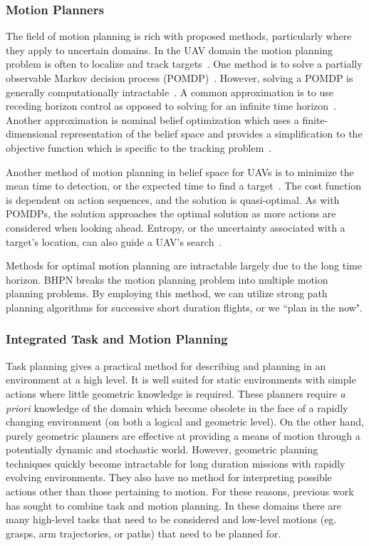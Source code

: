 \documentclass[12pt]{article}
\begin{document}
\subsubsection{Motion Planners} \label{motion planning}

The field of motion planning is rich with proposed methods, particularly where they apply to uncertain domains. In the UAV domain the motion planning problem is often to localize and track targets~\cite{miller2009pomdp}. One method is to solve a partially observable Markov decision process (POMDP)~\cite{ponzoni2012pomdp, chanel2013multi}. However, solving a POMDP is generally computationally intractable~\cite{hauskrecht2000value}. A common approximation is to use receding horizon control as opposed to solving for an infinite time horizon~\cite{murphy2000survey}. Another approximation is nominal belief optimization which uses a finite-dimensional representation of the belief space and provides a simplification to the objective function which is specific to the tracking problem~\cite{miller2009pomdp}.

Another method of motion planning in belief space for UAVs is to minimize the mean time to detection, or the expected time to find a target~\cite{bourgault2003coordinated, geyer2008active}. The cost function is dependent on action sequences, and the solution is quasi-optimal. As with POMDPs, the solution approaches the optimal solution as more actions are considered when looking ahead. Entropy, or the uncertainty associated with a target's location, can also guide a UAV's search~\cite{carpin2011searching}.

Methods for optimal motion planning are intractable largely due to the long time horizon. BHPN breaks the motion planning problem into multiple motion planning problems. By employing this method, we can utilize strong path planning algorithms for successive short duration flights, or we ``plan in the now".

\subsubsection{Integrated Task and Motion Planning} \label{integrated planning}

Task planning gives a practical method for describing and planning in an environment at a high level. It is well suited for static environments with simple actions where little geometric knowledge is required. These planners require \textit{a priori} knowledge of the domain which become obsolete in the face of a rapidly changing environment (on both a logical and geometric level). On the other hand, purely geometric planners are effective at providing a means of motion through a potentially dynamic and stochastic world. However, geometric planning techniques quickly become intractable for long duration missions with rapidly evolving environments. They also have no method for interpreting possible actions other than those pertaining to motion. For these reasons, previous work has sought to combine task and motion planning. In these domains there are many high-level tasks that need to be considered and low-level motions (eg. grasps, arm trajectories, or paths) that need to be planned for.
\end{document}
